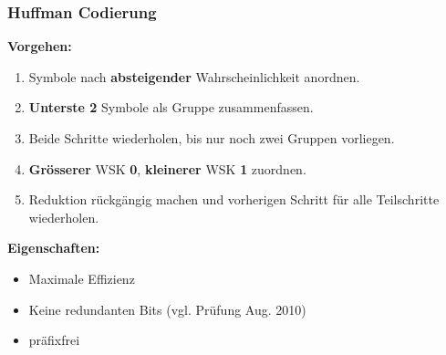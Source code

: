 \subsubsection{Huffman Codierung}
\begin{multicols}{2}
  
  \columnbreak
  
  	\textbf{Vorgehen:}
  	\begin{enumerate}
	  \item Symbole nach \textbf{absteigender} Wahrscheinlichkeit anordnen.
	  \item \textbf{Unterste 2} Symbole als Gruppe zusammenfassen.
	  \item Beide Schritte wiederholen, bis nur noch zwei Gruppen vorliegen.
	  \item \textbf{Grösserer} WSK \textbf{0}, \textbf{kleinerer} WSK \textbf{1} zuordnen.
	  \item Reduktion rückgängig machen und vorherigen Schritt für alle Teilschritte wiederholen.
	\end{enumerate}	
	
	\textbf{Eigenschaften:}
	\begin{itemize}
	  \item Maximale Effizienz
	  \item Keine redundanten Bits (vgl. Prüfung Aug. 2010)
	  \item präfixfrei
	\end{itemize}
\end{multicols}
